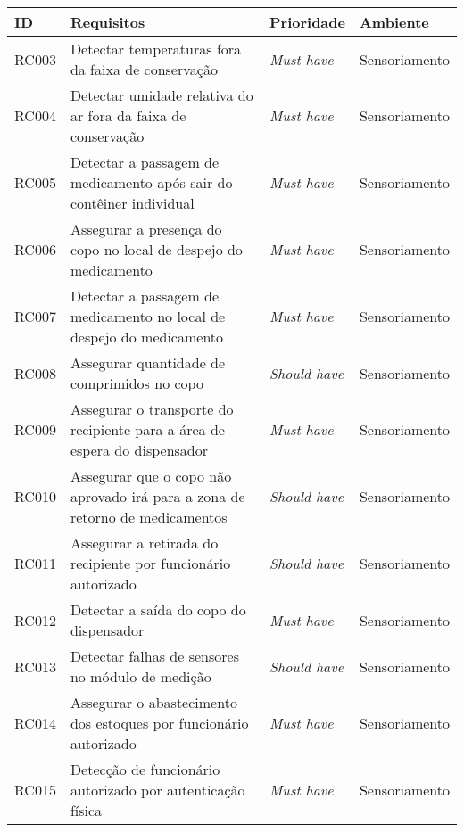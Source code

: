 \begin{table}[H]
    \centering
	\begin{adjustbox}{max width = \textwidth}
        \begin{tabular}{|L{1.5cm}|L{8.5cm}|C{2.5cm}|C{3.5cm}|}
        \hline
        \textbf{ID} & \textbf{Requisitos} & \textbf{Prioridade} & \textbf{Ambiente} \\ \hline
        RC003 & Detectar temperaturas fora da faixa de conservação & \textit{Must have} & Sensoriamento\\ \hline
        RC004 & Detectar umidade relativa do ar fora da faixa de conservação & \textit{Must have} & Sensoriamento\\ \hline
        RC005 & Detectar a passagem de medicamento após sair do contêiner individual &  \textit{Must have} & Sensoriamento\\ \hline
        RC006 & Assegurar a presença do copo no local de despejo do medicamento & \textit{Must have} & Sensoriamento\\ \hline
        RC007 & Detectar a passagem de medicamento no local de despejo do medicamento & \textit{Must have} & Sensoriamento\\ \hline
        RC008 & Assegurar quantidade de comprimidos no copo & \textit{Should have} & Sensoriamento\\ \hline
        RC009 & Assegurar o transporte do recipiente para a área de espera do dispensador & \textit{Must have} & Sensoriamento\\ \hline
        RC010 & Assegurar que o copo não aprovado irá para a zona de retorno de medicamentos & \textit{Should have} & Sensoriamento\\ \hline
        RC011 & Assegurar a retirada do recipiente por funcionário autorizado & \textit{Should have} & Sensoriamento\\ \hline
        RC012 & Detectar a saída do copo do dispensador & \textit{Must have} & Sensoriamento\\ \hline
        RC013 & Detectar falhas de sensores no módulo de medição & \textit{Should have} & Sensoriamento\\ \hline
        RC014 & Assegurar o abastecimento dos estoques por funcionário autorizado & \textit{Must have} & Sensoriamento\\ \hline
        RC015 & Detecção de funcionário autorizado por autenticação física & \textit{Must have} & Sensoriamento \\ \hline

\end{tabular}
\end{adjustbox}
\end{table}
